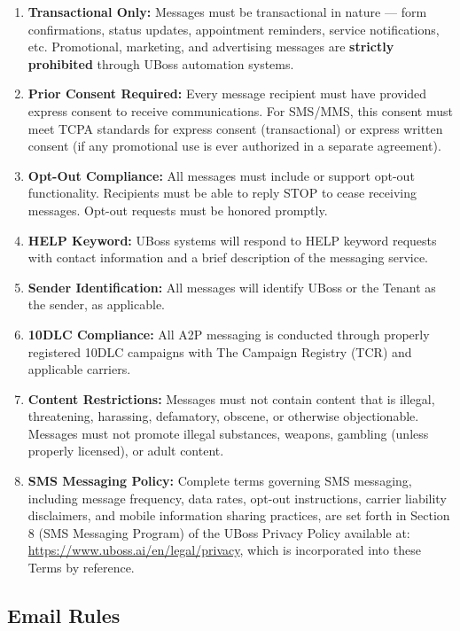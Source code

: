 \documentclass[11pt,letterpaper,parskip=half]{scrartcl}
\begin{document}
\begin{enumerate}[nosep, leftmargin=1.5em]
    \item \textbf{Transactional Only:} Messages must be transactional in nature --- form confirmations, status updates, appointment reminders, service notifications, etc. Promotional, marketing, and advertising messages are \textbf{strictly prohibited} through UBoss automation systems.
    \item \textbf{Prior Consent Required:} Every message recipient must have provided express consent to receive communications. For SMS/MMS, this consent must meet TCPA standards for express consent (transactional) or express written consent (if any promotional use is ever authorized in a separate agreement).
    \item \textbf{Opt-Out Compliance:} All messages must include or support opt-out functionality. Recipients must be able to reply STOP to cease receiving messages. Opt-out requests must be honored promptly.
    \item \textbf{HELP Keyword:} UBoss systems will respond to HELP keyword requests with contact information and a brief description of the messaging service.
    \item \textbf{Sender Identification:} All messages will identify UBoss or the Tenant as the sender, as applicable.
    \item \textbf{10DLC Compliance:} All A2P messaging is conducted through properly registered 10DLC campaigns with The Campaign Registry (TCR) and applicable carriers.
    \item \textbf{Content Restrictions:} Messages must not contain content that is illegal, threatening, harassing, defamatory, obscene, or otherwise objectionable. Messages must not promote illegal substances, weapons, gambling (unless properly licensed), or adult content.
      \item \textbf{SMS Messaging Policy:} Complete terms governing SMS messaging, including message frequency, data rates, opt-out instructions, carrier liability disclaimers, and mobile information sharing practices, are set forth in Section 8 (SMS Messaging Program) of the UBoss Privacy Policy available at: \href{https://www.uboss.ai/assets/legal/privacy_policy.pdf}{https://www.uboss.ai/en/legal/privacy}, which is incorporated into these Terms by reference. 
\end{enumerate}

\subsection{Email Rules}
\end{document}
